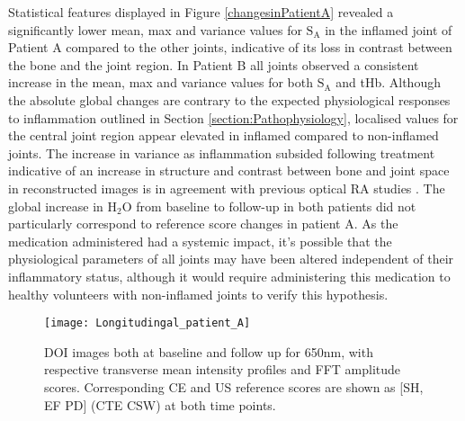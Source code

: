 \documentclass[twoside]{bhamthesis}
\theoremstyle{definition}
\begin{document}
Statistical features displayed in Figure \ref{changesinPatientA} revealed a significantly lower mean, max and variance values for $\mathrm{S_A}$ in the inflamed joint of Patient A compared to the other joints, indicative of its loss in contrast between the bone and the joint region. In Patient B all joints observed a consistent increase in the mean, max and variance values for both $\mathrm{S_A}$ and tHb. Although the absolute global changes are contrary to the expected physiological responses to inflammation outlined in Section 
\ref{section:Pathophysiology}, localised values for the central joint region appear elevated in inflamed compared to non-inflamed joints. The increase in variance as inflammation subsided following treatment indicative of an increase in structure and contrast between bone and joint space in reconstructed images is in agreement with previous optical RA studies \cite{montejo2013computer,yuan2010image}. The global increase in $\mathrm{H_2O}$ from baseline to follow-up in both patients did not particularly correspond to reference score changes in patient A. As the medication administered had a systemic impact, it's possible that the physiological parameters of all joints may have been altered independent of their inflammatory status, although it would require administering this medication to healthy volunteers with non-inflamed joints to verify this hypothesis.

\begin{figure}[!ht]
\centering\texttt{[image: Longitudingal\_patient\_A]}\caption{DOI images both at baseline and follow up for 650nm, with respective transverse mean intensity profiles and FFT amplitude scores. Corresponding CE and US reference scores are shown as [SH, EF PD] (CTE CSW) at both time points.}
\label{Longitudingal_patient_A}
\end{figure}
\end{document}
